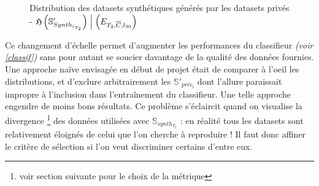 \begin{figure}[H]
            \qquad
            \qquad
            \qquad
            \caption{Distribution des datasets synthétiques générés par les datasets privés - $\mathfrak H\left( \mathbb{S}'_{Synth_{i_{T_{2}}}}\right) \Bigm \lvert \left(E_{T_2, \overline C, l_{30}}\right)$}
            \label{H15Synth}
        \end{figure}

        \label{divNonTrivial}\begin{tcolorbox}[colback=linkborder_Color!5!white,colframe=
linkborder_Color!75!
black]
            Ce changement d'échelle permet d'augmenter les performances du classifieur
            \textit{(voir \ref{classif})} sans pour autant se soucier davantage de la qualité des
            données fournies. Une approche naïve envisagée en début de projet était de comparer à
            l'oeil les distributions, et d'exclure arbitrairement les $\mathbb S'_{priv_i}$ dont
            l'allure paraissait impropre à l'inclusion dans l'entraînement du classifieur. Une
            telle approche engendre de moins bons résultats. Ce problème s'éclaircit quand on
            visualise la divergence \footnote{voir section suivante pour le choix de la métrique} des
            données utilisées avec $\mathbb S_{synth_{T_2}}$ : en réalité tous les datasets sont
            relativement éloignés de celui que l'on cherche à reproduire ! Il faut donc affiner le
            critère de sélection si l'on veut discriminer certains d'entre eux.
        \end{tcolorbox}

